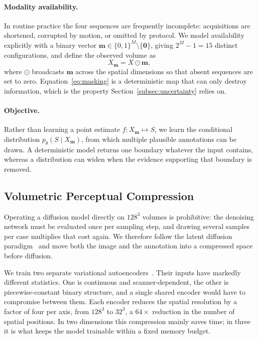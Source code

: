 \paragraph{Modality availability.}
In routine practice the four sequences are frequently incomplete: acquisitions
are shortened, corrupted by motion, or omitted by protocol. We model availability
explicitly with a binary vector $\mathbf{m} \in \{0,1\}^{M} \setminus
\{\mathbf{0}\}$, giving $2^{M} - 1 = 15$ distinct configurations, and define
the observed volume as
\begin{equation}
    X_{\mathbf{m}} = X \odot \mathbf{m},
    \label{eq:masking}
\end{equation}
where $\odot$ broadcasts $\mathbf{m}$ across the spatial dimensions so that
absent sequences are set to zero. Equation~\eqref{eq:masking} is a
deterministic map that can only destroy information, which is the property
Section~\ref{subsec:uncertainty} relies on.

\paragraph{Objective.}
Rather than learning a point estimate $f: X_{\mathbf{m}} \mapsto S$, we learn
the conditional distribution $p_{\theta}(S \mid X_{\mathbf{m}})$, from which
multiple plausible annotations can be drawn. A deterministic model returns one
boundary whatever the input contains, whereas a distribution can widen when
the evidence supporting that boundary is removed.

\subsection{Volumetric Perceptual Compression}
\label{subsec:compression}

Operating a diffusion model directly on $128^{3}$ volumes is prohibitive: the
denoising network must be evaluated once per sampling step, and drawing
several samples per case multiplies that cost again. We therefore follow the
latent diffusion paradigm~\cite{ldm} and move both the image and the
annotation into a compressed space before diffusion.

We train two separate variational autoencoders~\cite{vae}. Their inputs have
markedly different statistics. One is continuous and scanner-dependent, the
other is piecewise-constant binary structure, and a single shared encoder
would have to compromise between them. Each encoder
reduces the spatial resolution by a factor of four per axis, from $128^{3}$ to
$32^{3}$, a $64\times$ reduction in the number of spatial positions. In two dimensions this
compression mainly saves time; in three it is what keeps the model trainable
within a fixed memory budget.

